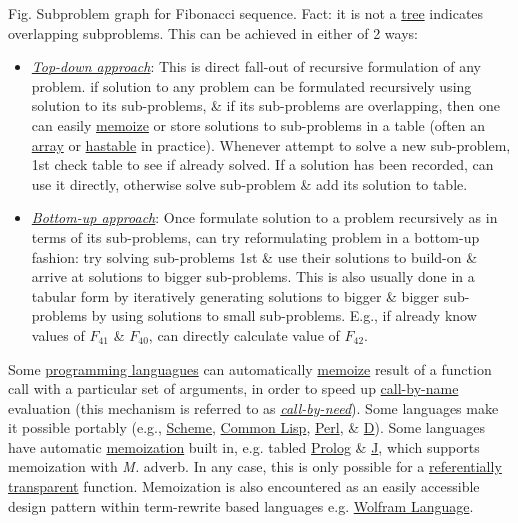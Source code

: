 \documentclass{article}
\begin{document}
\begin{enumerate}
	{\sf Fig. Subproblem graph for Fibonacci sequence. Fact: it is not a \href{https://en.wikipedia.org/wiki/Tree_structure}{tree} indicates overlapping subproblems.} This can be achieved in either of 2 ways:
	\begin{itemize}
		\item \href{https://en.wikipedia.org/wiki/Top-down_and_bottom-up_design}{\it Top-down approach}: This is direct fall-out of recursive formulation of any problem. if solution to any problem can be formulated recursively using solution to its sub-problems, \& if its sub-problems are overlapping, then one can easily \href{https://en.wikipedia.org/wiki/Memoize}{memoize} or store solutions to sub-problems in a table (often an \href{https://en.wikipedia.org/wiki/Array_(data_structure)}{array} or \href{https://en.wikipedia.org/wiki/Hash_table}{hastable} in practice). Whenever attempt to solve a new sub-problem, 1st check table to see if already solved. If a solution has been recorded, can use it directly, otherwise solve sub-problem \& add its solution to table.
		\item \href{https://en.wikipedia.org/wiki/Top-down_and_bottom-up_design}{\it Bottom-up approach}: Once formulate solution to a problem recursively as in terms of its sub-problems, can try reformulating problem in a bottom-up fashion: try solving sub-problems 1st \& use their solutions to build-on \& arrive at solutions to bigger sub-problems. This is also usually done in a tabular form by iteratively generating solutions to bigger \& bigger sub-problems by using solutions to small sub-problems. E.g., if already know values of $F_{41}$ \& $F_{40}$, can directly calculate value of $F_{42}$.
	\end{itemize}
	Some \href{https://en.wikipedia.org/wiki/Programming_language}{programming languagues} can automatically \href{https://en.wikipedia.org/wiki/Memoization}{memoize} result of a function call with a particular set of arguments, in order to speed up \href{https://en.wikipedia.org/wiki/Call-by-name}{call-by-name} evaluation (this mechanism is referred to as \href{https://en.wikipedia.org/wiki/Call-by-need}{\it call-by-need}). Some languages make it possible portably (e.g., \href{https://en.wikipedia.org/wiki/Scheme_(programming_language)}{Scheme}, \href{https://en.wikipedia.org/wiki/Common_Lisp}{Common Lisp}, \href{https://en.wikipedia.org/wiki/Perl}{Perl}, \& \href{https://en.wikipedia.org/wiki/D_(programming_language)}{D}). Some languages have automatic \href{https://en.wikipedia.org/wiki/Memoization}{memoization} built in, e.g. tabled \href{https://en.wikipedia.org/wiki/Prolog}{Prolog} \& \href{https://en.wikipedia.org/wiki/J_(programming_language)}{J}, which supports memoization with {\it M.} adverb. In any case, this is only possible for a \href{https://en.wikipedia.org/wiki/Referentially_transparent}{referentially transparent} function. Memoization is also encountered as an easily accessible design pattern within term-rewrite based languages e.g. \href{https://en.wikipedia.org/wiki/Wolfram_Language}{Wolfram Language}.

\end{enumerate}
\end{document}
